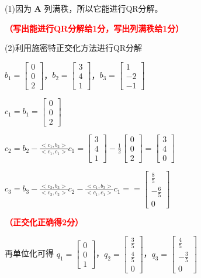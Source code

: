 \documentclass[12pt,a4paper,openany,twoside]{ctexbook}
\begin{document}
\begin{Solution}

	(1)因为 $\mathbf{A}$ 列满秩，所以它能进行QR分解。
	
	\hfill \textcolor{red}{\textbf{（写出能进行QR分解给1分，写出列满秩给1分）}}

	(2)利用施密特正交化方法进行QR分解

	$b_1=\begin{bmatrix}  
	0 \\  
	0 \\
	2 
	\end{bmatrix}$，$b_2=\begin{bmatrix}  
	3 \\  
	4 \\
	1 
	\end{bmatrix}$，$b_3=\begin{bmatrix}  
	1 \\  
	-2 \\
	-1 
	\end{bmatrix}$
	
	$c_1=b_1=\begin{bmatrix}  
	0 \\  
	0 \\
	2 
	\end{bmatrix}$
	
	$c_2=b_2-\frac{<c_1,b_2>}{<c_1,c_1>}c_1=\begin{bmatrix}  
	3 \\  
	4 \\
	1 
	\end{bmatrix}-\frac{1}{2} \begin{bmatrix}  
	0 \\  
	0 \\
	2 
	\end{bmatrix}=\begin{bmatrix}  
	3 \\  
	4 \\
	0 
	\end{bmatrix}$
	
	$c_3=b_3-\frac{<c_2,b_3>}{<c_2,c_2>}c_2-\frac{<c_1,b_3>}{<c_1,c_1>}c_1==\begin{bmatrix}  
	\frac{8}{5} \\  
	-\frac{6}{5} \\
	0 
	\end{bmatrix}$
	
	\hfill \textcolor{red}{\textbf{（正交化正确得2分）}}

	再单位化可得 $q_1=\begin{bmatrix}  
	0 \\  
	0 \\
	1 
	\end{bmatrix}$，$q_2=\begin{bmatrix}  
	\frac{3}{5} \\  
	\frac{4}{5} \\
	0 
	\end{bmatrix}$，$q_3=\begin{bmatrix}  
	\frac{4}{5} \\  
	-\frac{3}{5} \\
	0 
	\end{bmatrix}$
	

\end{Solution}
\end{document}
